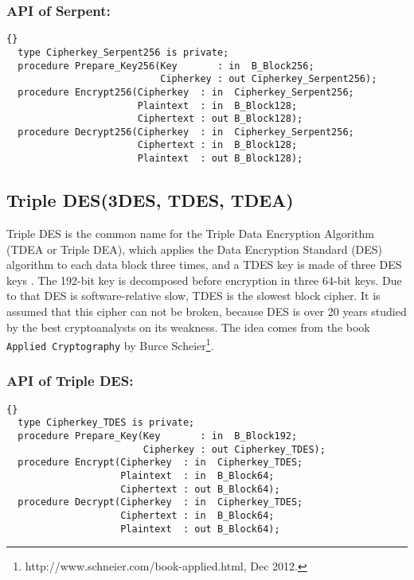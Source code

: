 \subsubsection*{API of Serpent:}
\begin{lstlisting}{}
  type Cipherkey_Serpent256 is private;
  procedure Prepare_Key256(Key       : in  B_Block256;
                           Cipherkey : out Cipherkey_Serpent256);
  procedure Encrypt256(Cipherkey  : in  Cipherkey_Serpent256;
                       Plaintext  : in  B_Block128;
                       Ciphertext : out B_Block128);
  procedure Decrypt256(Cipherkey  : in  Cipherkey_Serpent256;
                       Ciphertext : in  B_Block128;
                       Plaintext  : out B_Block128);
\end{lstlisting}

\subsection{Triple DES(3DES, TDES, TDEA)}
Triple DES is the common name for the Triple Data Encryption Algorithm
(TDEA or Triple DEA), which applies the Data Encryption Standard (DES)
algorithm to each data block three times, and a TDES key is made of
three DES keys \cite{DES-FIPS}. The 192-bit key is decomposed before
encryption in three 64-bit keys. Due to that DES is software-relative
slow, TDES is the slowest block cipher. It is assumed that this cipher
can not be broken, because DES is over 20 years studied by the best
cryptoanalysts on its weakness. The idea comes from the book
\texttt{Applied Cryptography} by Burce
Scheier\footnote{http://www.schneier.com/book-applied.html, Dec
  2012.}.
\subsubsection*{API of Triple DES:}
\begin{lstlisting}{}
  type Cipherkey_TDES is private;
  procedure Prepare_Key(Key       : in  B_Block192;
                        Cipherkey : out Cipherkey_TDES);
  procedure Encrypt(Cipherkey  : in  Cipherkey_TDES;
                    Plaintext  : in  B_Block64;
                    Ciphertext : out B_Block64);
  procedure Decrypt(Cipherkey  : in  Cipherkey_TDES;
                    Ciphertext : in  B_Block64;
                    Plaintext  : out B_Block64);
\end{lstlisting}
\newpage
